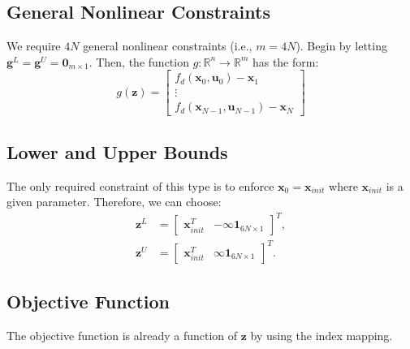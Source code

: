 \documentclass[12pt, letterpaper]{report}
\newcommand{\vect}[1]{\boldsymbol{\mathbf{#1}}}
\newcommand{\mat}[1]{\begin{bmatrix} #1 \end{bmatrix}}
\begin{document}
\subsection*{General Nonlinear Constraints}
We require $4N$ general nonlinear constraints (i.e., $m=4N$). Begin by
letting $\vect{g}^L = \vect{g}^U = \vect{0}_{m\times 1}$. Then, the
function $g:\mathbb{R}^{n}\rightarrow \mathbb{R}^m$ has the form:
\begin{equation}
  g(\vect{z}) = \mat{f_d(\vect{x}_0,\vect{u}_0) - \vect{x}_1 \\
  \vdots \\ f_d(\vect{x}_{N-1},\vect{u}_{N-1}) - \vect{x}_N}
\end{equation}

\subsection*{Lower and Upper Bounds}
The only required constraint of this type is to enforce $\vect{x}_0 =
\vect{x}_{init}$ where $\vect{x}_{init}$ is a given parameter.
Therefore, we can choose:
\begin{subequations}
  \begin{align}
    \vect{z}^L &= \mat{\vect{x}_{init}^T & -\infty\vect{1}_{6N\times
    1}}^T,\\
    \vect{z}^U &= \mat{\vect{x}_{init}^T & \infty\vect{1}_{6N\times
    1}}^T.
  \end{align}
\end{subequations}

\subsection*{Objective Function}
The objective function is already a function of $\vect{z}$ by using the
index mapping.


\end{document}
